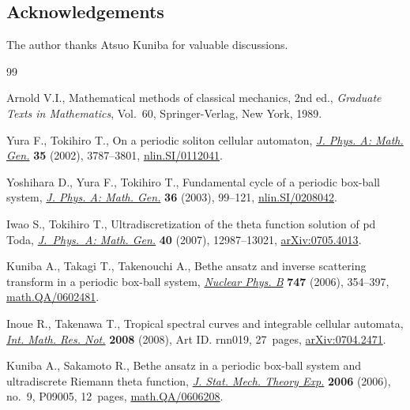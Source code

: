 \documentclass[pdftex]{sigma}
\begin{document}
\subsection*{Acknowledgements}
The author thanks Atsuo Kuniba for
valuable discussions.

\begin{thebibliography}{99}

\footnotesize\itemsep=0pt

Arnold V.I.,
Mathematical methods of classical mechanics, 2nd ed.,
{\it Graduate Texts in Mathematics}, Vol.~60, Springer-Verlag, New York, 1989.


Yura F., Tokihiro T.,
On a periodic soliton cellular automaton,
\href{http://dx.doi.org/10.1088/0305-4470/35/16/317}{{\it J. Phys. A: Math. Gen.}} {\bf 35} (2002), 3787--3801,
\href{http://arxiv.org/abs/nlin.SI/0112041}{nlin.SI/0112041}.

Yoshihara D., Yura F., Tokihiro T.,
Fundamental cycle of a periodic box-ball system,
\href{http://dx.doi.org/10.1088/0305-4470/36/1/307}{{\it J. Phys. A: Math. Gen.}} {\bf 36} (2003), 99--121,
\href{http://arxiv.org/abs/nlin.SI/0208042}{nlin.SI/0208042}.


Iwao S., Tokihiro T.,
Ultradiscretization of the theta function solution of pd Toda,
\href{http://dx.doi.org/10.1088/1751-8113/40/43/010}{{\it J.~Phys.~A: Math. Gen.}} {\bf 40} (2007), 12987--13021,
\href{http://arxiv.org/abs/0705.4013}{arXiv:0705.4013}.

Kuniba A., Takagi T., Takenouchi A.,
Bethe ansatz and inverse scattering transform in a periodic box-ball system,
\href{http://dx.doi.org/10.1016/j.nuclphysb.2006.04.003}{{\it Nuclear Phys. B}} {\bf 747}  (2006), 354--397,
\href{http://arxiv.org/abs/math.QA/0602481}{math.QA/0602481}.

Inoue R., Takenawa T.,
Tropical spectral curves and integrable cellular automata,
\href{http://dx.doi.org/10.1093/imrn/rnn019}{{\it Int. Math. Res. Not.}} {\bf 2008} (2008), Art ID. rnn019,   27~pages,
\href{http://arxiv.org/abs/0704.2471}{arXiv:0704.2471}.

Kuniba A., Sakamoto R.,
Bethe ansatz in a periodic box-ball system and ultradiscrete Riemann theta function,
\href{http://dx.doi.org/10.1088/1742-5468/2006/09/P09005}{{\it J. Stat. Mech. Theory Exp.}} {\bf 2006} (2006), no.~9, P09005, 12~pages,
\href{http://arxiv.org/abs/math.QA/0606208}{math.QA/0606208}.



\end{thebibliography}
\end{document}
